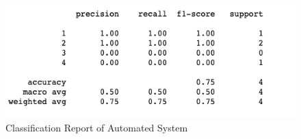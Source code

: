 \begin{figure}[!htp]
    \includegraphics[width=\textwidth]{Images/a10r.png}
    \caption{Classification Report of Automated System}
    \label{fig:f11}
\end{figure}